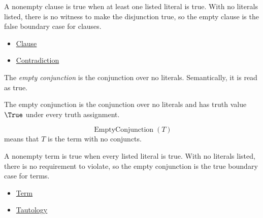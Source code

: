 \begin{remark*}[Interpretation]
A nonempty clause is true when at least one listed literal is true. With no
literals listed, there is no witness to make the disjunction true, so the empty
clause is the false boundary case for clauses.
\end{remark*}

\begin{dependencies}
\begin{itemize}
  \item \hyperref[def:clause-propositional-logic]{Clause}
  \item \hyperref[def:contradiction-propositional-logic]{Contradiction}
\end{itemize}
\end{dependencies}

\begin{tcolorbox}[colback=propbox, colframe=propborder, arc=2pt,
  left=6pt, right=6pt, top=4pt, bottom=4pt,
  title={\small\textbf{Definition (Empty Conjunction)}},
  fonttitle=\small\bfseries]
\begin{definition}
\label{def:empty-conjunction-propositional-logic}
The \emph{empty conjunction} is the conjunction over no literals. Semantically,
it is read as true.
\end{definition}
\end{tcolorbox}

\begin{remark*}
The empty conjunction is the conjunction over no literals and has truth value
\(\True\) under every truth assignment.
\end{remark*}

\begin{remark*}
\[
\operatorname{EmptyConjunction}(T)
\]
means that \(T\) is the term with no conjuncts.
\end{remark*}

\begin{remark*}[Interpretation]
A nonempty term is true when every listed literal is true. With no literals
listed, there is no requirement to violate, so the empty conjunction is the true
boundary case for terms.
\end{remark*}

\begin{dependencies}
\begin{itemize}
  \item \hyperref[def:term-propositional-logic]{Term}
  \item \hyperref[def:tautology-propositional-logic]{Tautology}
\end{itemize}
\end{dependencies}
